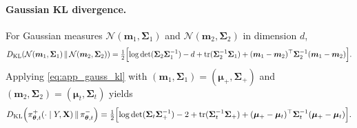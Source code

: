 \documentclass{article}
\DeclareMathOperator{\tr}{tr}
\newcommand{\bs}[1]{\boldsymbol{#1}}
\newcommand{\bX}{\mathbf{X}}
\newcommand{\KL}[2]{D_{\mathrm{KL}}\!\left(#1\,\|\,#2\right)}
\begin{document}
\paragraph{Gaussian KL divergence.}
For Gaussian measures $\mathcal N(\bs m_1,\bs\Sigma_1)$ and $\mathcal N(\bs m_2,\bs\Sigma_2)$ in dimension $d$,
\begin{equation}
\label{eq:app_gauss_kl}
\KL{\mathcal N(\bs m_1,\bs\Sigma_1)}{\mathcal N(\bs m_2,\bs\Sigma_2)}
=
\tfrac12\Bigl[
\log\det(\bs\Sigma_2\bs\Sigma_1^{-1})
-d
+\tr(\bs\Sigma_2^{-1}\bs\Sigma_1)
+(\bs m_1-\bs m_2)^\top \bs\Sigma_2^{-1}(\bs m_1-\bs m_2)
\Bigr].
\end{equation}
Applying \eqref{eq:app_gauss_kl} with $(\bs m_1,\bs\Sigma_1)=(\bs\mu_+,\bs\Sigma_+)$ and $(\bs m_2,\bs\Sigma_2)=(\bs\mu_t,\bs\Sigma_t)$ yields
\begin{equation}
\label{eq:app_kl_post_prior}
\KL{\pi_{\bs\theta,t}^+(\cdot\mid Y,\bX)}{\pi_{\bs\theta,t}^-}
=
\tfrac12\Bigl[
\log\det(\bs\Sigma_t\bs\Sigma_+^{-1})
-2
+\tr(\bs\Sigma_t^{-1}\bs\Sigma_+)
+(\bs\mu_+-\bs\mu_t)^\top \bs\Sigma_t^{-1}(\bs\mu_+-\bs\mu_t)
\Bigr].
\end{equation}
\end{document}

